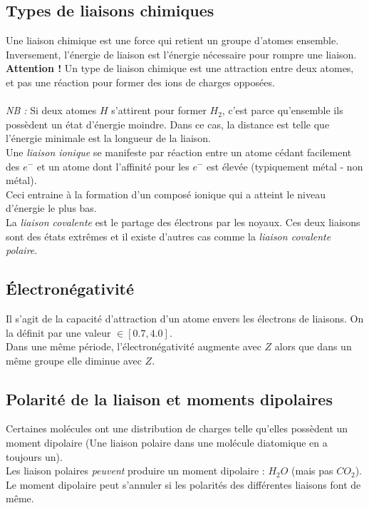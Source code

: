 \documentclass[12pt, a4paper]{article}
\begin{document}
\subsection{Types de liaisons chimiques}
Une liaison chimique est une force qui retient un groupe d'atomes ensemble. Inversement, l'énergie de liaison est l'énergie nécessaire pour rompre une liaison.\\
\textbf{Attention !} Un type de liaison chimique est une attraction entre deux atomes, et pas une réaction pour former des ions de charges opposées.\\\\
\textit{NB :} Si deux atomes $H$ s'attirent pour former $H_2$, c'est parce qu'ensemble ils possèdent un état d'énergie moindre. Dans ce cas, la distance est telle que l'énergie minimale est la longueur de la liaison.\\

Une \textit{liaison ionique} se manifeste par réaction entre un atome cédant facilement des $e^-$ et un atome dont l'affinité pour les $e^-$ est élevée (typiquement métal - non métal).\\
Ceci entraine à la formation d'un composé ionique qui a atteint le niveau d'énergie le plus bas.\\
La \textit{liaison covalente} est le partage des électrons par les noyaux. Ces deux liaisons sont des états extrêmes et il existe d'autres cas comme la \textit{liaison covalente polaire}.

\subsection{Électronégativité}
Il s'agit de la capacité d'attraction d'un atome envers les électrons de liaisons. On la définit par une valeur $\in [0.7, 4.0]$.\\
Dans une même période, l'électronégativité augmente avec $Z$ alors que dans un même groupe elle diminue avec $Z$.

\subsection{Polarité de la liaison et moments dipolaires}
Certaines molécules ont une distribution de charges telle qu'elles possèdent un moment dipolaire (Une liaison polaire dans une molécule diatomique en a toujours un).\\
Les liaison polaires \textit{peuvent} produire un moment dipolaire : $H_2O$ (mais pas $CO_2$).\\
Le moment dipolaire peut s'annuler si les polarités des différentes liaisons font de même.
\end{document}
